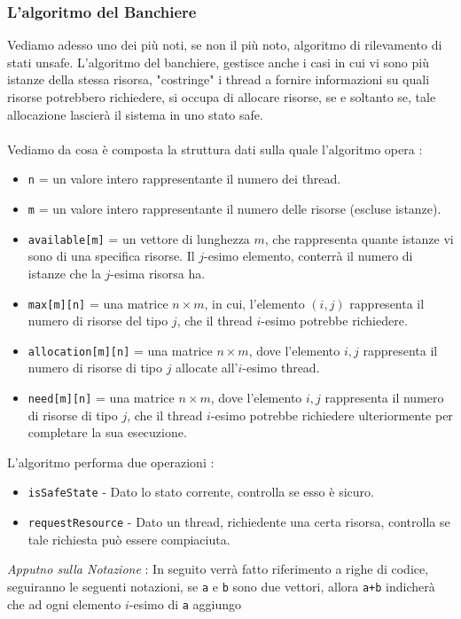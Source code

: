 \documentclass[12pt, letterpaper]{article}
\newcommand{\code}[1]{\colorbox{light-gray}{\texttt{#1}}}
\newcommand{\acc}{\\\hphantom{}\\}
\begin{document}
\subsubsection{L'algoritmo del Banchiere}
Vediamo adesso uno dei più noti, se non il più noto, algoritmo di rilevamento di stati unsafe. L'algoritmo del banchiere, 
gestisce anche i casi in cui vi sono più istanze della stessa risorsa, "costringe" i thread a fornire informazioni 
su quali risorse potrebbero richiedere, si occupa di allocare risorse, se e soltanto se, tale allocazione 
lascierà il sistema in uno stato safe.\acc 
Vediamo da cosa è composta la struttura dati sulla quale l'algoritmo opera : \begin{itemize}
    \item \code{n} = un valore intero rappresentante il numero dei thread.
    \item \code{m} = un valore intero rappresentante il numero delle risorse (escluse istanze).
    \item \code{available[m]} = un vettore di lunghezza \(m\), che rappresenta quante istanze vi sono di una specifica 
    risorse. Il \(j\)-esimo elemento, conterrà il numero di istanze che la \(j\)-esima risorsa ha. 
    \item \code{max[m][n]} = una matrice \(n\times m\), in cui, l'elemento \((i,j)\) rappresenta 
    il numero di risorse del tipo \(j\), che il thread \(i\)-esimo potrebbe richiedere. 
    \item \code{allocation[m][n]} = una matrice \(n\times m\), dove l'elemento \(i,j\) rappresenta il numero di 
    risorse di tipo \(j\) allocate all'\(i\)-esimo thread.
    \item \code{need[m][n]} = una matrice \(n\times m\), dove l'elemento \(i,j\) rappresenta il numero di 
    risorse di tipo \(j\), che il thread \(i\)-esimo potrebbe richiedere ulteriormente per completare la sua 
    esecuzione.
\end{itemize}
L'algoritmo performa due operazioni : \begin{itemize}
    \item \code{isSafeState} - Dato lo stato corrente, controlla se esso è sicuro. 
    \item \code{requestResource} - Dato un thread, richiedente una certa risorsa, controlla se tale richiesta 
    può essere compiaciuta.
\end{itemize}
\textit{Apputno sulla Notazione }: In seguito verrà fatto riferimento a righe di codice, seguiranno le seguenti notazioni, se 
\code{a} e \code{b} sono due vettori, allora \code{a+b} indicherà che ad ogni elemento \(i\)-esimo di \code{a} aggiungo 
\end{document}

